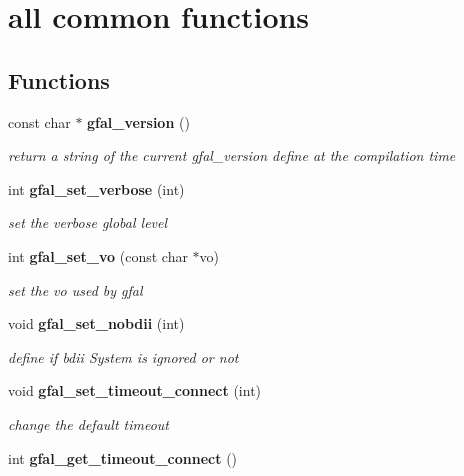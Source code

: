 \section{all common functions}
\label{group__common__group}
\subsection*{Functions}
\begin{DoxyCompactItemize}
\item 
const char $\ast$ {\bf gfal\_\-version} ()\label{group__common__group_gaa469918e49f4c3194b8f42c87fdd8137}

\begin{DoxyCompactList}\small\item\em return a string of the current gfal\_\-version define at the compilation time \item\end{DoxyCompactList}\item 
int {\bf gfal\_\-set\_\-verbose} (int)
\begin{DoxyCompactList}\small\item\em set the verbose global level \item\end{DoxyCompactList}\item 
int {\bf gfal\_\-set\_\-vo} (const char $\ast$vo)\label{group__common__group_gacef0c28f0787235cf38a17442ebcd960}

\begin{DoxyCompactList}\small\item\em set the vo used by gfal \item\end{DoxyCompactList}\item 
void {\bf gfal\_\-set\_\-nobdii} (int)
\begin{DoxyCompactList}\small\item\em define if bdii System is ignored or not \item\end{DoxyCompactList}\item 
void {\bf gfal\_\-set\_\-timeout\_\-connect} (int)\label{group__common__group_gaf11091a5cce3f5cf4a74a4388977c103}

\begin{DoxyCompactList}\small\item\em change the default timeout \item\end{DoxyCompactList}\item 
int {\bf gfal\_\-get\_\-timeout\_\-connect} ()\label{group__common__group_ga54e9b5620d46ad7fde2f9c5930d8c55f}


\end{DoxyCompactItemize}
